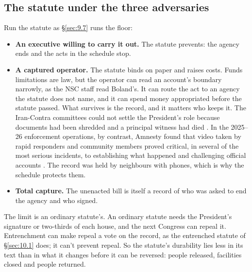 \subsection{The statute under the three adversaries}
\label{sec:9.4.4}
Run the statute as \S\ref{sec:9.7} runs the floor:

\begin{itemize}
\item \textbf{An executive willing to carry it out.} The statute prevents: the agency ends and the acts in the schedule stop.
\item \textbf{A captured operator.} The statute binds on paper and raises costs. Funds limitations are law, but the operator can read an account's boundary narrowly, as the NSC staff read Boland's. It can route the act to an agency the statute does not name, and it can spend money appropriated before the statute passed. What survives is the record, and it matters who keeps it. The Iran-Contra committees could not settle the President's role because documents had been shredded and a principal witness had died \autocite{irancontra1987}. In the 2025–26 enforcement operations, by contrast, Amnesty found that video taken by rapid responders and community members proved critical, in several of the most serious incidents, to establishing what happened and challenging official accounts \autocite{Amnesty2026Whistles}. The record was held by neighbours with phones, which is why the schedule protects them.
\item \textbf{Total capture.} The unenacted bill is itself a record of who was asked to end the agency and who signed.
\end{itemize}

The limit is an ordinary statute's. An ordinary statute needs the President's signature or two-thirds of each house, and the next Congress can repeal it. Entrenchment can make repeal a vote on the record, as the entrenched statute of \S\ref{sec:10.1} does; it can't prevent repeal. So the statute's durability lies less in its text than in what it changes before it can be reversed: people released, facilities closed and people returned.
